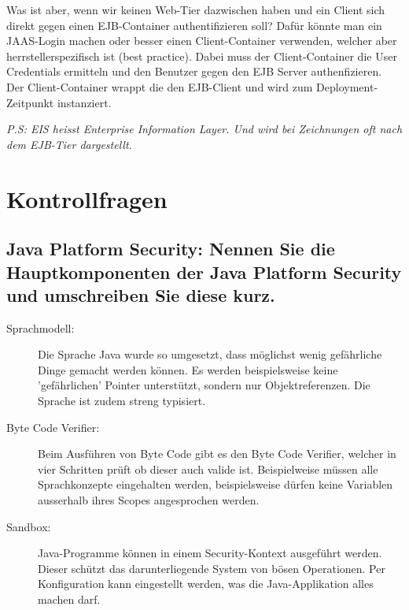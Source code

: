 Was ist aber, wenn wir keinen Web-Tier dazwischen haben und ein Client sich direkt gegen einen EJB-Container authentifizieren soll? Dafür könnte man ein JAAS-Login machen oder besser einen Client-Container verwenden, welcher aber herrstellerspezifisch ist (best practice). Dabei muss der Client-Container die User Credentials ermitteln und den Benutzer gegen den EJB Server authenfizieren. Der Client-Container wrappt die den EJB-Client und wird zum Deployment-Zeitpunkt instanziert.

\emph{P.S: EIS heisst Enterprise Information Layer. Und wird bei Zeichnungen oft nach dem EJB-Tier dargestellt.} 







\section{Kontrollfragen}

\subsection{Java Platform Security: Nennen Sie die Hauptkomponenten der Java Platform Security und umschreiben Sie diese kurz.}

\begin{description}
	\item[Sprachmodell:] Die Sprache Java wurde so umgesetzt, dass möglichst wenig gefährliche Dinge gemacht werden können. Es werden beispielsweise keine 'gefährlichen' Pointer unterstützt, sondern nur Objektreferenzen. Die Sprache ist zudem streng typisiert.
	
	\item[Byte Code Verifier:] Beim Ausführen von Byte Code gibt es den Byte Code Verifier, welcher in vier Schritten prüft ob dieser auch valide ist. Beispielweise müssen alle Sprachkonzepte eingehalten werden, beispielsweise dürfen keine Variablen ausserhalb ihres Scopes angesprochen werden.
	
	\item[Sandbox:] Java-Programme können in einem Security-Kontext ausgeführt werden. Dieser schützt das darunterliegende System von bösen Operationen. Per Konfiguration kann eingestellt werden, was die Java-Applikation alles machen darf.
	
\end{description}

